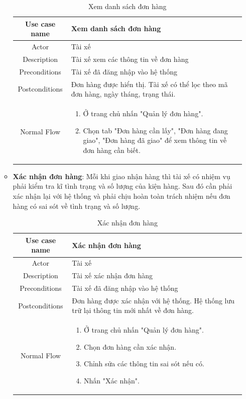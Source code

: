 \begin{itemize}
\begin{itemize}
		\begin{table}[H]
			\centering\begin{tabular}{|c|m{25em}|}
				\hline 
				Use case name & Xem danh sách đơn hàng\\ 
				\hline 
				Actor & Tài xế \\ 
				\hline
				Description & Tài xế xem các thông tin về đơn hàng \\
				\hline 
				Preconditions & Tài xế đã đăng nhập vào hệ thống \\
				\hline
				Postconditions & Đơn hàng được hiển thị. Tài xế có thể lọc theo mã đơn hàng, ngày tháng, trạng thái. \\
				\hline
				Normal Flow & \begin{enumerate}
					\item Ở trang chủ nhấn "Quản lý đơn hàng".
					\item Chọn tab "Đơn hàng cần lấy", "Đơn hàng đang giao", "Đơn hàng đã giao" để xem thông tin về đơn hàng cần biết.	
				\end{enumerate}
				\\
				\hline
			\end{tabular}
			\caption{Xem danh sách đơn hàng}
		\end{table}
	
		\item \textbf{Xác nhận đơn hàng}: Mỗi khi giao nhận hàng thì tài xế có nhiệm vụ phải kiểm tra kĩ tình trạng và số lượng của kiện hàng. Sau đó cần phải xác nhận lại với hệ thống và phải chịu hoàn toàn trách nhiệm nếu đơn hàng có sai sót về tình trạng và số lượng.
		
		\begin{table}[H]
			\centering\begin{tabular}{|c|m{25em}|}
				\hline 
				Use case name & Xác nhận đơn hàng\\ 
				\hline 
				Actor & Tài xế \\ 
				\hline
				Description & Tài xế xác nhận đơn hàng \\
				\hline 
				Preconditions & Tài xế đã đăng nhập vào hệ thống \\
				\hline
				Postconditions & Đơn hàng được xác nhận với hệ thống. Hệ thống lưu trữ lại thông tin mới nhất về đơn hàng. \\
				\hline
				Normal Flow & \begin{enumerate}
					\item Ở trang chủ nhấn "Quản lý đơn hàng".
					\item Chọn đơn hàng cần xác nhận.
					\item Chỉnh sửa các thông tin sai sót nếu có.
					\item Nhấn "Xác nhận".
				\end{enumerate}
				\\
				\hline
			\end{tabular}
			\caption{Xác nhận đơn hàng}
		\end{table}
		

\end{itemize}
\end{itemize}
